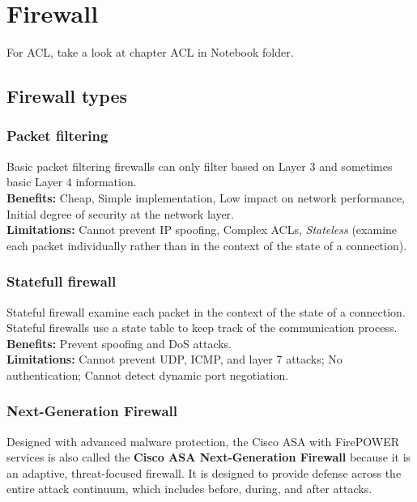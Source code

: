 \chapter{Firewall}

For ACL, take a look at chapter ACL in Notebook folder.\\

\section{Firewall types}

\subsection{Packet filtering}

Basic packet filtering firewalls can only filter based on Layer 3 and sometimes basic Layer 4 information. \\

\textbf{Benefits:} Cheap, Simple implementation, Low impact on network performance, Initial degree of security at the network layer.\\

\textbf{Limitations:} Cannot prevent IP spoofing, Complex ACLs, \emph{Stateless} (examine each packet individually rather than in the context of the state of a connection).

\subsection{Statefull firewall}

Stateful firewall examine each packet in the context of the state of a connection. Stateful firewalls use a state table to keep track of the communication process.\\ 

\textbf{Benefits:} Prevent spoofing and DoS attacks.\\ 

\textbf{Limitations:} Cannot prevent UDP, ICMP, and layer 7 attacks; No authentication; Cannot detect dynamic port negotiation.

\subsection{Next-Generation Firewall}

Designed with advanced malware protection, the Cisco ASA with FirePOWER services is also called the \textbf{Cisco ASA Next-Generation Firewall} because it is an adaptive, threat-focused firewall. It is designed to provide defense across the entire attack continuum, which includes before, during, and after attacks.

